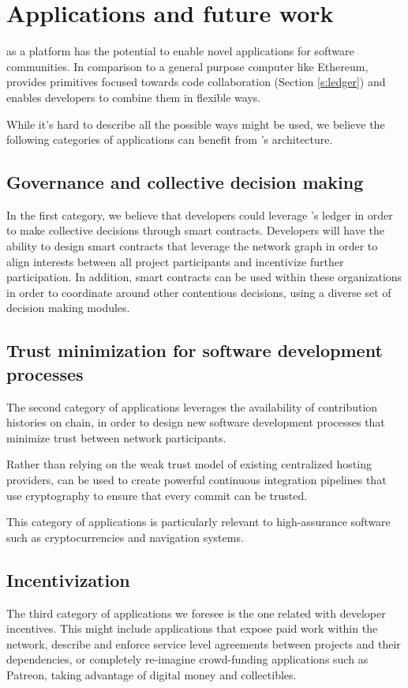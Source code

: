 
\section{Applications and future work}

\oscoin{} as a platform has the potential to enable novel applications for
software communities. In comparison to a general purpose computer like
Ethereum, \oscoin{} provides primitives focused towards code collaboration
(Section \ref{s:ledger}) and enables developers to combine them in flexible ways.

While it’s hard to describe all the possible ways \oscoin{} might be used, we
believe the following categories of applications can benefit from \oscoin{}’s
architecture.

\subsection{Governance and collective decision making}

In the first category, we believe that developers could leverage \oscoin{}’s
ledger in order to make collective decisions through smart contracts. Developers
will have the ability to design smart contracts that leverage the network graph in
order to align interests between all project participants and incentivize further
participation. In addition, smart contracts can be used within these organizations
in order to coordinate around other contentious decisions, using a diverse set of
decision making modules.

\subsection{Trust minimization for software development processes}
The second category of applications leverages the availability of contribution
histories on chain, in order to design new software development processes that
minimize trust between network participants.

Rather than relying on the weak trust model of existing centralized hosting
providers, \oscoin{} can be used to create powerful continuous integration
pipelines that use cryptography to ensure that every commit can be trusted.

This category of applications is particularly relevant to high-assurance
software such as cryptocurrencies and navigation systems.

\subsection{Incentivization}
The third category of applications we foresee is the one related with
developer incentives. This might include applications that expose paid work
within the \oscoin{} network, describe and enforce service level agreements
between projects and their dependencies, or completely re-imagine crowd-funding
applications such as Patreon, taking advantage of digital money and collectibles.

